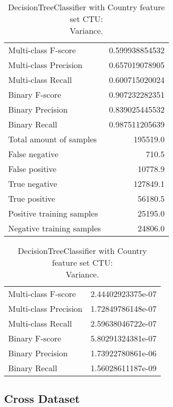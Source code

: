 \begin{table}[H]
\begin{minipage}{0.5\textwidth}
\caption{DecisionTreeClassifier with Country feature set CTU: \\Average.}
\centering
\begin{tabular}{l r}
\toprule
Multi-class F-score & 0.599938854532 \\
Multi-class Precision & 0.657019078905 \\
Multi-class Recall & 0.600715020024 \\
\midrule
Binary F-score & 0.907232282351 \\
Binary Precision & 0.839025445532 \\
Binary Recall & 0.987511205639 \\
\midrule
Total amount of samples & 195519.0 \\
False negative & 710.5 \\
False positive & 10778.9 \\
True negative & 127849.1 \\
True positive & 56180.5 \\
\midrule
Positive training samples & 25195.0 \\
Negative training samples & 24806.0 \\
\bottomrule
\end{tabular}
\end{minipage}
\hfillx
\begin{minipage}{0.5\textwidth}
\caption{DecisionTreeClassifier with Country feature set CTU: \\Variance.}
\centering
\begin{tabular}{l r}
\toprule
Multi-class F-score & 2.44402923375e-07 \\
Multi-class Precision & 1.72849786148e-07 \\
Multi-class Recall & 2.59638046722e-07 \\
\midrule
Binary F-score & 5.80291324381e-07 \\
Binary Precision & 1.73922780861e-06 \\
Binary Recall & 1.56028611187e-09 \\
\bottomrule
\end{tabular}
\end{minipage}
\end{table}

\newpage
\subsection{Cross Dataset}

